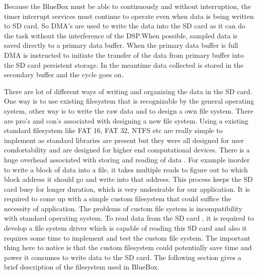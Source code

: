 Because the BlueBox must be able to continuously and without interruption, the timer interrupt services must continue to operate even when data is being written to SD card. So DMA's are used to write the data into the SD card as it can do the task without the interference of the DSP.When possible, sampled data is saved directly to a primary data buffer. When the primary data buffer is full DMA is instructed to initiate the transfer of the data from primary buffer into the SD card persistent storage. In the meantime data collected is stored in the secondary buffer and the cycle goes on. 

There are lot of different ways of writing and organizing the data in the SD card. One way is to use existing filesystem that is recognizable by the general operating system, other way is to write the raw data and to design a own file system. There are pro's and con's associated with designing a new file system. Using a existing standard filesystem like FAT 16, FAT 32, NTFS etc are really simple to implement as standard libraries are present but they were all designed for user comfortability and are designed for higher end computational devices. There is a huge overhead associated with storing and reading of data . For example inorder to write a block of data into a file, it takes multiple reads to figure out to which block address it should go and write into that address. This process keeps the SD card busy for longer duration, which is very undesirable for our application. It is required to come up with a simple custom filesystem that could suffice the necessity of application. The problems of custom file system is incompatibility with standard operating system. To read data from the SD card , it is required to develop a file system driver which is capable of reading this SD card and also it requires some time to implement and test the custom file system. The important thing here to notice is that the custom filesystem could potentially save time and power it consumes to write data to the SD card. The following section gives a brief description of the filesystem used in BlueBox. 

